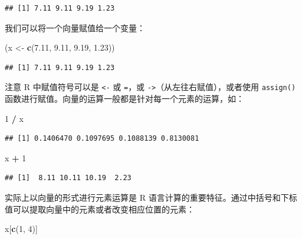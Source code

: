 \documentclass[
  b5paper,
  UTF8,twoside]{book}
\newenvironment{Shaded}{\begin{snugshade}}{\end{snugshade}}
\newcommand{\DecValTok}[1]{\textcolor[rgb]{0.00,0.00,0.81}{#1}}
\newcommand{\FloatTok}[1]{\textcolor[rgb]{0.00,0.00,0.81}{#1}}
\newcommand{\FunctionTok}[1]{\textcolor[rgb]{0.13,0.29,0.53}{\textbf{#1}}}
\newcommand{\NormalTok}[1]{#1}
\newcommand{\OtherTok}[1]{\textcolor[rgb]{0.56,0.35,0.01}{#1}}
\newcommand{\SpecialCharTok}[1]{\textcolor[rgb]{0.81,0.36,0.00}{\textbf{#1}}}
\begin{document}
\begin{verbatim}
## [1] 7.11 9.11 9.19 1.23
\end{verbatim}

我们可以将一个向量赋值给一个变量：

\begin{Shaded}
\begin{Highlighting}[]
\NormalTok{(x }\OtherTok{\textless{}{-}} \FunctionTok{c}\NormalTok{(}\FloatTok{7.11}\NormalTok{, }\FloatTok{9.11}\NormalTok{, }\FloatTok{9.19}\NormalTok{, }\FloatTok{1.23}\NormalTok{))}
\end{Highlighting}
\end{Shaded}

\begin{verbatim}
## [1] 7.11 9.11 9.19 1.23
\end{verbatim}

注意 R 中赋值符号可以是 \texttt{\textless{}-} 或 \texttt{=}，或 \texttt{-\textgreater{}}（从左往右赋值），或者使用 \texttt{assign()} 函数进行赋值。向量的运算一般都是针对每一个元素的运算，如：

\begin{Shaded}
\begin{Highlighting}[]
\DecValTok{1} \SpecialCharTok{/}\NormalTok{ x}
\end{Highlighting}
\end{Shaded}

\begin{verbatim}
## [1] 0.1406470 0.1097695 0.1088139 0.8130081
\end{verbatim}

\begin{Shaded}
\begin{Highlighting}[]
\NormalTok{x }\SpecialCharTok{+} \DecValTok{1}
\end{Highlighting}
\end{Shaded}

\begin{verbatim}
## [1]  8.11 10.11 10.19  2.23
\end{verbatim}

实际上以向量的形式进行元素运算是 R 语言计算的重要特征。通过中括号和下标值可以提取向量中的元素或者改变相应位置的元素：

\begin{Shaded}
\begin{Highlighting}[]
\NormalTok{x[}\FunctionTok{c}\NormalTok{(}\DecValTok{1}\NormalTok{, }\DecValTok{4}\NormalTok{)]}
\end{Highlighting}
\end{Shaded}
\end{document}
